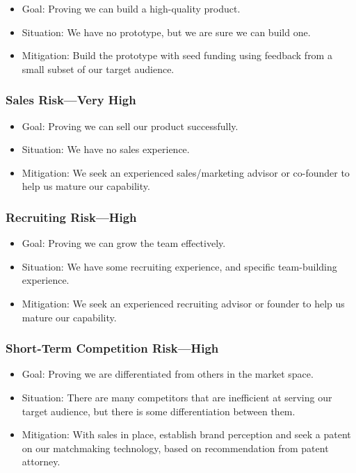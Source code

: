 \documentclass[11pt,openany]{book}
\providecommand{\tightlist}{%
  \setlength{\itemsep}{0pt}\setlength{\parskip}{0pt}}
\begin{document}
\begin{itemize}
\tightlist
\item
  Goal: Proving we can build a high-quality product.
\item
  Situation: We have no prototype, but we are sure we can build one.
\item
  Mitigation: Build the prototype with seed funding using feedback from
  a small subset of our target audience.
\end{itemize}

\hypertarget{sales-riskvery-high}{%
\subsubsection{Sales Risk---Very High}\label{sales-riskvery-high}}

\begin{itemize}
\tightlist
\item
  Goal: Proving we can sell our product successfully.
\item
  Situation: We have no sales experience.
\item
  Mitigation: We seek an experienced sales/marketing advisor or
  co-founder to help us mature our capability.
\end{itemize}

\hypertarget{recruiting-riskhigh}{%
\subsubsection{Recruiting Risk---High}\label{recruiting-riskhigh}}

\begin{itemize}
\tightlist
\item
  Goal: Proving we can grow the team effectively.
\item
  Situation: We have some recruiting experience, and specific
  team-building experience.
\item
  Mitigation: We seek an experienced recruiting advisor or founder to
  help us mature our capability.
\end{itemize}

\hypertarget{short-term-competition-riskhigh}{%
\subsubsection{Short-Term Competition
Risk---High}\label{short-term-competition-riskhigh}}

\begin{itemize}
\tightlist
\item
  Goal: Proving we are differentiated from others in the market space.
\item
  Situation: There are many competitors that are inefficient at serving
  our target audience, but there is some differentiation between them.
\item
  Mitigation: With sales in place, establish brand perception and seek a
  patent on our matchmaking technology, based on recommendation from
  patent attorney.
\end{itemize}
\end{document}
